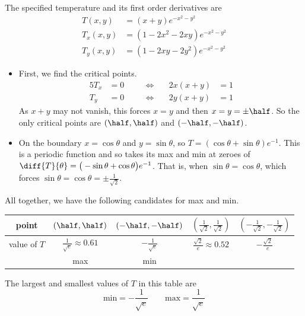 \begin{solution}
The specified temperature and its first order derivatives are
\begin{align*}
T(x,y)&=(x+y)e^{-x^2-y^2}\\
T_x(x,y)&=(1-2x^2-2xy)e^{-x^2-y^2}\\
T_y(x,y)&=(1-2xy-2y^2)e^{-x^2-y^2}
\end{align*}
\begin{itemize}
\item
First, we find the critical points.
\begin{alignat*}{5}
T_x&=0 & &\quad\iff\quad & 2x(x+y)&=1 \\
T_y&=0 & &\quad\iff\quad & 2y(x+y)&=1 
\end{alignat*}
As $x+y$ may not vanish, this forces $x=y$ and then $x=y=\pm\half$.
So the only critical points are $(\half,\half)$ and $(-\half,-\half)$. 
\item
 On the boundary $x=\cos\theta$ and $y=\sin\theta$, 
so $T=(\cos\theta+\sin\theta)e^{-1}$.
This is a periodic function and so takes its max and min at zeroes of
$\diff{T}{\theta}=\big(-\sin\theta+\cos\theta\big)e^{-1}$. That is, 
when $\sin\theta=\cos\theta$,
which forces $\sin\theta=\cos\theta=\pm\frac{1}{\sqrt{2}}$. 
\end{itemize}
All together, we have the following candidates for max and min.
\begin{center}
\renewcommand{\arraystretch}{1.3}
     \begin{tabular}{|c|c|c|c|c|}
     \hline
       point
       &$(\half,\half)$
       &$(-\half,-\half)$
       &$(\frac{1}{\sqrt{2}},\frac{1}{\sqrt{2}})$ 
       &$(-\frac{1}{\sqrt{2}},-\frac{1}{\sqrt{2}})$ \\ \hline
       value of $T$
       &$\frac{1}{\sqrt{e}}\approx0.61$
       &$-\frac{1}{\sqrt{e}}$
       &$\frac{\sqrt{2}}{e}\approx0.52$
       &$-\frac{\sqrt{2}}{e}$ \\ \hline
       &max
       &min    
       &  
       &
       \\ \hline
     \end{tabular}
\renewcommand{\arraystretch}{1.0}
\end{center}
The largest and smallest values of $T$ in this table are
\begin{equation*}
\text{min}=-\frac{1}{\sqrt{e}}\qquad
\text{max}=\frac{1}{\sqrt{e}}
\end{equation*}
\end{solution}



